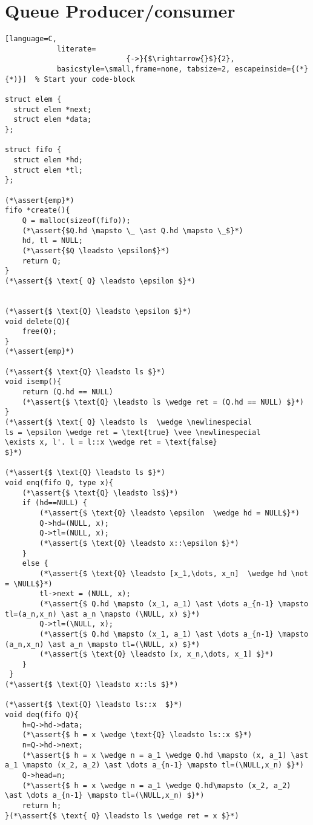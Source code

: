 \documentclass[8pt]{article}
\newcommand{\assert}[1]{\textcolor{blue}{ \{ #1 \}  } }
\newcommand{\NULL}{\text{NULL }}
\newcommand{\newlinespecial}{\newline \hphantom{100pt}}
\begin{document}
\section{Queue Producer/consumer}
\begin{lstlisting}[language=C,
			literate=
               				{->}{$\rightarrow{}$}{2},
			basicstyle=\small,frame=none, tabsize=2, escapeinside={(*}{*)}]  % Start your code-block

struct elem {
  struct elem *next;
  struct elem *data;
};

struct fifo {
  struct elem *hd;
  struct elem *tl;
};

(*\assert{emp}*)
fifo *create(){
	Q = malloc(sizeof(fifo));
	(*\assert{$Q.hd \mapsto \_ \ast Q.hd \mapsto \_$}*)
	hd, tl = NULL;
	(*\assert{$Q \leadsto \epsilon$}*)
	return Q;
}
(*\assert{$ \text{ Q} \leadsto \epsilon $}*)


(*\assert{$ \text{Q} \leadsto \epsilon $}*)
void delete(Q){
	free(Q);
}
(*\assert{emp}*)

(*\assert{$ \text{Q} \leadsto ls $}*)
void isemp(){
	return (Q.hd == NULL)
	(*\assert{$ \text{Q} \leadsto ls \wedge ret = (Q.hd == NULL) $}*)
}
(*\assert{$ \text{ Q} \leadsto ls  \wedge \newlinespecial
ls = \epsilon \wedge ret = \text{true} \vee \newlinespecial
\exists x, l'. l = l::x \wedge ret = \text{false}
$}*)

(*\assert{$ \text{Q} \leadsto ls $}*)
void enq(fifo Q, type x){
	(*\assert{$ \text{Q} \leadsto ls$}*)
	if (hd==NULL) {
		(*\assert{$ \text{Q} \leadsto \epsilon  \wedge hd = NULL$}*)
		Q->hd=(NULL, x);
		Q->tl=(NULL, x);
		(*\assert{$ \text{Q} \leadsto x::\epsilon $}*)
	}
  	else {
		(*\assert{$ \text{Q} \leadsto [x_1,\dots, x_n]  \wedge hd \not = \NULL$}*)
		tl->next = (NULL, x);
		(*\assert{$ Q.hd \mapsto (x_1, a_1) \ast \dots a_{n-1} \mapsto tl=(a_n,x_n) \ast a_n \mapsto (\NULL, x) $}*)
		Q->tl=(\NULL, x);
		(*\assert{$ Q.hd \mapsto (x_1, a_1) \ast \dots a_{n-1} \mapsto (a_n,x_n) \ast a_n \mapsto tl=(\NULL, x) $}*)
		(*\assert{$ \text{Q} \leadsto [x, x_n,\dots, x_1] $}*)
	}
 }
(*\assert{$ \text{Q} \leadsto x::ls $}*)

(*\assert{$ \text{Q} \leadsto ls::x  $}*)
void deq(fifo Q){
	h=Q->hd->data;
	(*\assert{$ h = x \wedge \text{Q} \leadsto ls::x $}*)
	n=Q->hd->next;
	(*\assert{$ h = x \wedge n = a_1 \wedge Q.hd \mapsto (x, a_1) \ast a_1 \mapsto (x_2, a_2) \ast \dots a_{n-1} \mapsto tl=(\NULL,x_n) $}*)
	Q->head=n;
	(*\assert{$ h = x \wedge n = a_1 \wedge Q.hd\mapsto (x_2, a_2) \ast \dots a_{n-1} \mapsto tl=(\NULL,x_n) $}*)
	return h;
}(*\assert{$ \text{ Q} \leadsto ls \wedge ret = x $}*)


\end{lstlisting}
\end{document}
